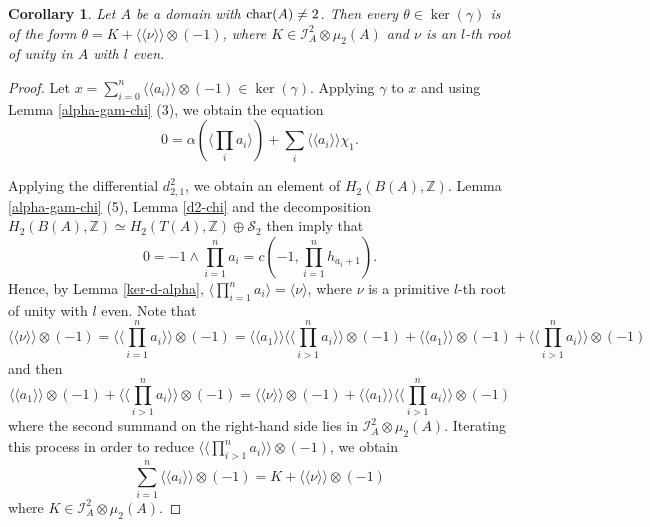 \documentclass[11pt]{amsart}
\theoremstyle{definition}
\theoremstyle{plain}
\newtheorem{cor}[ntn]{Corollary}
\theoremstyle{definition}
\numberwithin{equation}{section}
\newcommand{\z}{\mathbb{Z}}
\newcommand{\II}{\mathcal{I}}
\renewcommand{\SS}{\mathcal{S}}
\newcommand{\lan}{\langle}
\newcommand{\ran}{\rangle}
\newcommand{\Lan}{\langle \! \langle}
\newcommand{\Ran}{\rangle \! \rangle}
\renewcommand{\char}{{\rm char}}
\begin{document}
	\begin{cor}\label{ker-gam}
		Let $A$ be a domain with $\char(A)\neq 2$. Then every $\theta\in\ker(\gamma)$ is of the form $\theta=K+\Lan \nu\Ran\otimes(-1)$, where $K\in\II^2_A\otimes\mu_2(A)$ and $\nu$ is an $l$-th root of unity in $A$ with $l$ even.
	\end{cor}
	\begin{proof}
		Let $x=\displaystyle\sum_{i=0}^n\Lan a_i\Ran\otimes(-1)\in\ker(\gamma)$. Applying $\gamma$ to $x$ and using Lemma \ref{alpha-gam-chi} (3), we obtain the equation
		\[
		0=\alpha(\lan\prod_i a_i\ran)+\sum_i\Lan a_i\Ran\chi_1.
		\]
		
		Applying the differential $d^2_{2,1}$, we obtain an element of $H_2(B(A),\z)$. Lemma \ref{alpha-gam-chi} (5), Lemma \ref{d2-chi} and the decomposition $H_2(B(A),\z)\simeq H_2(T(A),\z)\oplus \SS_2$ then imply that
		\[
		0=-1\wedge\prod_{i=1}^na_i=c(-1,\prod_{i=1}^nh_{a_i+1}).
		\]
		Hence, by Lemma \ref{ker-d-alpha}, $\displaystyle\lan\prod_{i=1}^na_i\ran=\lan\nu\ran$, where $\nu$ is a primitive $l$-th root of unity with $l$ even. Note that
		\[
		\Lan\nu\Ran\otimes(-1)=\Lan\prod_{i=1}^na_i\Ran\otimes(-1)=\Lan a_1\Ran\Lan\prod_{i>1}^na_i\Ran\otimes(-1)+\Lan a_1\Ran\otimes(-1)+\Lan\prod_{i>1}^na_i\Ran\otimes(-1)
		\]
		and then
		\[
		\Lan a_1\Ran\otimes(-1)+\Lan\prod_{i>1}^na_i\Ran\otimes(-1)=\Lan\nu\Ran\otimes(-1)+\Lan a_1\Ran\Lan\prod_{i>1}^na_i\Ran\otimes(-1)
		\]
		where the second summand on the right-hand side lies in $\II^2_A\otimes\mu_2(A)$. Iterating this process in order to reduce $\displaystyle\Lan\prod_{i>1}^na_i\Ran\otimes(-1)$, we obtain
		\[
		\sum_{i=1}^n\Lan a_i\Ran\otimes(-1)=K+\Lan\nu\Ran\otimes(-1)
		\]
		where $K\in \II^2_A\otimes\mu_2(A)$.
	\end{proof}
\end{document}
